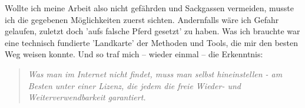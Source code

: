 Wollte ich meine Arbeit also nicht gefährden und Sackgassen vermeiden, musste ich die gegebenen Möglichkeiten zuerst sichten. Andernfalls wäre ich Gefahr gelaufen, zuletzt doch 'aufs falsche Pferd gesetzt' zu haben. Was ich brauchte war eine technisch fundierte 'Landkarte' der Methoden und Tools, die mir den besten Weg weisen konnte. Und so traf mich -- wieder einmal -- die Erkenntnis:

\begin{quote}\textit{Was man im Internet nicht findet, muss man selbst hineinstellen - am Besten unter einer Lizenz, die jedem die freie Wieder- und Weiterverwendbarkeit garantiert.} \end{quote}

%
